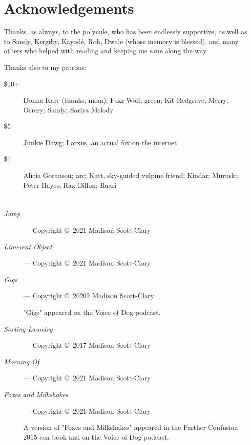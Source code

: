 \chapter*{Acknowledgements}

Thanks, as always, to the polycule, who has been endlessly supportive, as well as to Sandy, Kergiby, Kayodé, Rob, Dwale (whose memory is blessed), and many others who helped with reading and keeping me sane along the way.

Thanks also to my patrons:

\begin{description}
    \item[\$10+]
    Donna Karr (thanks, mom); Fuzz Wolf; green; Kit Redgrave; Merry; Orrery; Sandy; Sariya Melody

    \item[\$5]
    Junkie Dawg; Lorxus, an actual fox on the internet

    \item[\$1]
    Alicia Goranson; arc; Katt, sky-guided vulpine friend; Kindar; Muruski; Peter Hayes; Rax Dillon; Ruari
\end{description}

\chapter*{}

\begin{description}
    \item[\emph{Jump}]
    --- Copyright \copyright\ 2021 Madison Scott-Clary

    \item[\emph{Limerent Object}]
    --- Copyright \copyright\ 2021 Madison Scott-Clary

    \item[\emph{Gigs}]
    --- Copyright \copyright\ 20202 Madison Scott-Clary

    "Gigs" appeared on the Voice of Dog podcast.

    \item[\emph{Sorting Laundry}]
    --- Copyright \copyright\ 2017 Madison Scott-Clary

    \item[\emph{Morning Of}]
    --- Copyright \copyright\ 2021 Madison Scott-Clary

    \item[\emph{Foxes and Milkshakes}]
    --- Copyright \copyright\ 2021 Madison Scott-Clary

    A version of "Foxes and Milkshakes" appeared in the Further Confusion 2015 con book and on the Voice of Dog podcast.
\end{description}
\newpage
\thispagestyle{empty}
\null
\vfill

